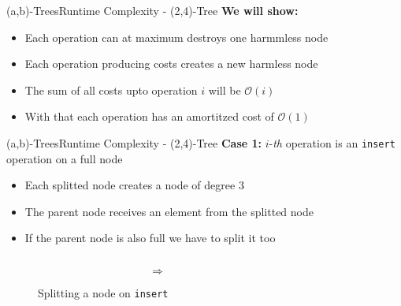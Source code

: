 
\begin{frame}{(a,b)-Trees}{Runtime Complexity - (2,4)-Tree}
  \textbf{We will show:}
  \begin{itemize}
    \item
      Each operation can at maximum destroys one harmmless node
    \item
      Each operation producing costs creates a new harmless node
    \item
      The sum of all costs upto operation {\color{Mittel-Blau}$i$} will be
      {\color{Mittel-Blau}$\mathcal{O}(i)$}
    \item
      With that each operation has an amortitzed cost of
      {\color{Mittel-Blau}$\mathcal{O}(1)$}
  \end{itemize}
\end{frame}


\begin{frame}{(a,b)-Trees}{Runtime Complexity - (2,4)-Tree}
  \textbf{Case 1:}
  {\color{Mittel-Blau}$i$}-\textit{th} operation is an
  \texttt{\color{Mittel-Blau}insert} operation on a full node
  \begin{itemize}
    \item
      Each splitted node creates a node of {\color{Mittel-Blau}degree 3}
    \item
      The parent node receives an element from the splitted node
    \item
      If the parent node is also full we have to split it too
  \end{itemize}
  \begin{figure}
    \begin{columns}
      \begin{column}{0.35\linewidth}
        \begin{adjustbox}{width=\linewidth}
          
        \end{adjustbox}
      \end{column}
      \begin{column}{0.1\linewidth}
        \begin{center}
          $\Rightarrow$
        \end{center}
      \end{column}
      \begin{column}{0.35\linewidth}
        \begin{adjustbox}{width=\linewidth}
          
        \end{adjustbox}
      \end{column}
    \end{columns}
    \caption{Splitting a node on \texttt{\color{Mittel-Blau}insert}}
    \label{fig:a_b_tree:node_split_potential}
  \end{figure}
\end{frame}

